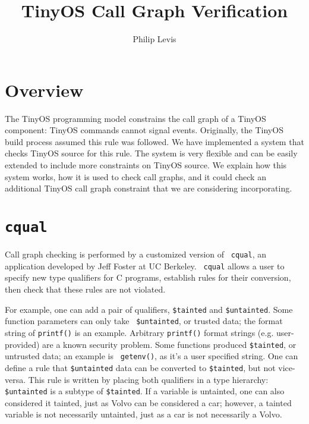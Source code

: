 \documentclass[12pt]{article}
\begin{document}
\fontsize{10}{10}                               %

\title{TinyOS Call Graph Verification}
\author{Philip Levis}
\maketitle

\fontsize{10}{10}                               %

\section*{Overview}

The TinyOS programming model constrains the call graph of a TinyOS
component: TinyOS commands cannot signal events. Originally, the
TinyOS build process assumed this rule was followed. We have
implemented a system that checks TinyOS source for this rule. The
system is very flexible and can be easily extended to include more
constraints on TinyOS source. We explain how this system works, how it
is used to check call graphs, and it could check an additional TinyOS
call graph constraint that we are considering incorporating.

\section*{{\tt cqual}}

Call graph checking is performed by a customized version of {\tt
cqual}, an application developed by Jeff Foster at UC Berkeley. {\tt
cqual} allows a user to specify new type qualifiers for C programs,
establish rules for their conversion, then check that these rules are
not violated.

For example, one can add a pair of qualifiers, {\tt \$tainted} and
{\tt \$untainted}. Some function parameters can only take {\tt
\$untainted}, or trusted data; the format string of {\tt printf()} is
an example. Arbitrary {\tt printf()} format strings
(e.g. user-provided) are a known security problem. Some functions
produced {\tt \$tainted}, or untrusted data; an example is {\tt
getenv()}, as it's a user specified string. One can define a rule that
{\tt \$untainted} data can be converted to {\tt \$tainted}, but not
vice-versa. This rule is written by placing both qualifiers in a type
hierarchy: {\tt \$untainted} is a subtype of {\tt \$tainted}. If a
variable is untainted, one can also considered it tainted, just as
Volvo can be considered a car; however, a tainted variable is not
necessarily untainted, just as a car is not necessarily a Volvo.
\end{document}
